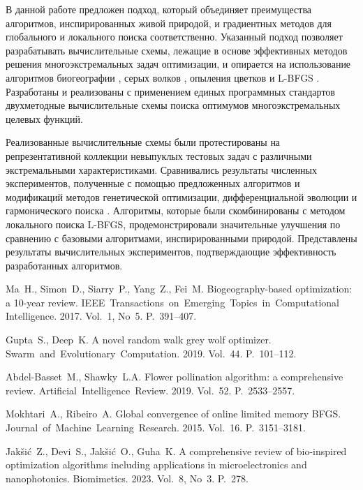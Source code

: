В данной работе предложен подход, который объединяет преимущества алгоритмов, инспирированных живой природой, и градиентных методов для глобального и локального поиска соответственно. Указанный подход позволяет разрабатывать вычислительные схемы, лежащие в основе эффективных методов решения многоэкстремальных задач оптимизации, и опирается на использование алгоритмов биогеографии \cite{Ma}, серых волков \cite{Gupta}, опыления цветков \cite{Abdel-Basset} и L-BFGS \cite{Mokhtari}. Разработаны и реализованы с применением единых программных стандартов двухметодные вычислительные схемы поиска оптимумов многоэкстремальных целевых функций.

Реализованные вычислительные схемы были протестированы на репрезентативной коллекции невыпуклых тестовых задач с различными экстремальными характеристиками. Сравнивались результаты численных экспериментов, полученные с помощью предложенных алгоритмов и модификаций методов генетической оптимизации, дифференциальной эволюции и гармонического поиска \cite{Jaksic}. Алгоритмы, которые были скомбинированы с методом локального поиска L-BFGS, продемонстрировали значительные улучшения по сравнению с базовыми алгоритмами, инспирированными природой. Представлены результаты вычислительных экспериментов, подтверждающие эффективность разработанных алгоритмов.

\begin{thebibliography}{9} %
 Ma~H., Simon~D., Siarry~P., Yang~Z., Fei~M.  Biogeography-based optimization: a 10-year review. IEEE~Transactions~on~Emerging~Topics~in~Computational Intelligence. 2017. Vol.~1, No~5. P.~391--407.

 Gupta~S., Deep~K. A novel random walk grey wolf optimizer. Swarm~and~Evolutionary~Computation. 2019. Vol.~44. P.~101--112.
  
 Abdel-Basset~M., Shawky~L.A. Flower pollination algorithm: a comprehensive review. Artificial~Intelligence~Review. 2019. Vol.~52. P.~2533--2557.
  
 Mokhtari~A., Ribeiro~A. Global convergence of online limited memory BFGS. Journal~of~Machine~Learning~Research. 2015. Vol.~16. P.~3151--3181.

 Jakšić~Z., Devi~S., Jakšić~O., Guha~K. A comprehensive review of bio-inspired optimization algorithms including applications in microelectronics and nanophotonics. Biomimetics. 2023. Vol.~8, No~3. P.~278.

\end{thebibliography}





%

